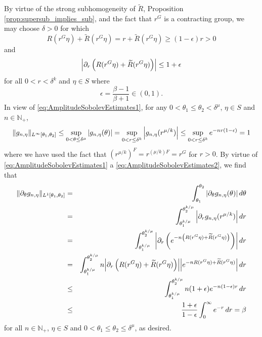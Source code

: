 \documentclass[smallextended]{svjour3}
\theoremstyle{remark}
\renewenvironment{proof}[1][\proofname]{\renewcommand\xproofname{#1}\xproof}{\endxproof}
\newcommand{\p}{\partial}
\begin{document}
\begin{proof}
By virtue of the strong subhomogeneity of $\widetilde{R}$, Proposition \ref{prop:supersub_implies_sub}, and the fact that $r^G$ is a contracting group, we may choose $\delta>0$ for which 
\begin{equation}\label{eq:AmplitudeSobolevEstimates1}
    R(r^G\eta)+\widetilde{R}\left(r^G\eta\right)=r+\widetilde{R}\left(r^G\eta\right)\geq (1-\epsilon)r > 0
\end{equation}
and
\begin{equation}\label{eq:AmplitudeSobolevEstimates2}
    \abs{\partial_r\left(R(r^G\eta)+\widetilde{R}(r^G\eta)\right)}\leq 1+\epsilon
\end{equation}
for all $0< r<\delta^k$ and $\eta\in S$ where
\begin{equation*}
    \epsilon=\frac{\beta-1}{\beta+1}\in(0,1).
\end{equation*}
In view of \eqref{eq:AmplitudeSobolevEstimates1}, for any $0< \theta_1\leq\theta_2<\delta^{\mu}$, $\eta\in S$ and $n\in\mathbb{N}_+$,
\begin{equation*}
\|g_{n,\eta}\|_{L^\infty[\theta_1,\theta_2]}\leq\sup_{0<\theta\leq\delta^{\mu}}\abs{g_{n,\eta}(\theta)}=\sup_{0<r\leq\delta^k}\abs{g_{n,\eta}(r^{\mu/k})}\leq \sup_{0<r\leq \delta^k}e^{-nr(1-\epsilon)}= 1
\end{equation*}
where we have used the fact that $(r^{\mu/k})^F=r^{(\mu/k)F}=r^G$ for $r>0$. By virtue of \eqref{eq:AmplitudeSobolevEstimates1} a \eqref{eq:AmplitudeSobolevEstimates2}, we find that
\begin{eqnarray*}
\|\partial_{\theta}g_{n,\eta}\|_{L^1[\theta_1,\theta_2]}
&=&\int_{\theta_1}^{\theta_2}\abs{\p_\theta g_{n,\eta}(\theta)}\,d\theta\\
&=&\int_{\theta_1^{k/\mu}}^{\theta_2^{k/\mu}}\abs{\p_r g_{n,\eta}(r^{\mu/k})}\,dr\\
&=&\int_{\theta_1^{k/\mu}}^{\theta_2^{k/\mu}}\abs{\p_r \left(e^{-n\left(R(r^G\eta)+\widetilde{R}(r^G\eta)\right)}\right) }\,dr\\
&=&\int_{\theta_1^{k/\mu}}^{\theta_2^{k/\mu}}n\abs{\partial_r\left(R(r^G\eta)+\widetilde{R}(r^G\eta)\right)}\abs{e^{-nR(r^G\eta)+\widetilde{R}(r^G\eta)}}\,dr\\
&\leq&\int_{\theta_1^{k/\mu}}^{\theta_2^{k/\mu}}n(1+\epsilon)e^{-n(1-\epsilon)r}\,dr\\
&\leq &\frac{1+\epsilon}{1-\epsilon}\int_0^\infty e^{-r}\,dr=\beta
\end{eqnarray*}
for all $n\in\mathbb{N}_+$, $\eta\in S$ and $0<\theta_1\leq\theta_2\leq\delta^{\mu}$, as desired.
\end{proof}
\end{document}
